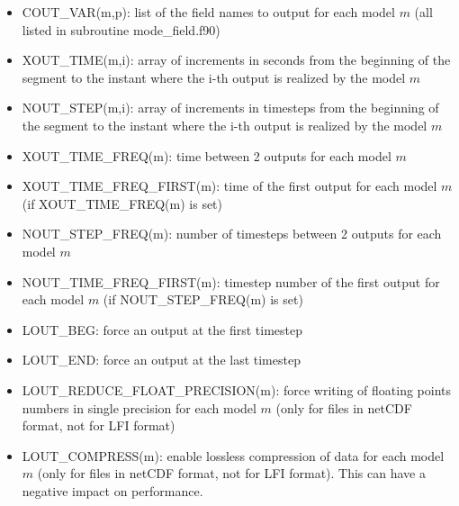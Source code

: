 \begin{itemize}

\item
COUT\_VAR(m,p): list of the field names to output for each model $m$ (all listed in subroutine mode\_field.f90)

\item
{} 
XOUT\_TIME(m,i): array of increments in seconds from the beginning of the segment to the instant where the i-th output is realized by the model $m$

\item
{} 
NOUT\_STEP(m,i): array of increments in timesteps from the beginning of the segment to the instant where the i-th output is realized by the model $m$

\item
{} 
XOUT\_TIME\_FREQ(m): time between 2 outputs for each model $m$

\item
{} 
XOUT\_TIME\_FREQ\_FIRST(m): time of the first output for each model $m$ (if XOUT\_TIME\_FREQ(m) is set)

\item
{} 
NOUT\_STEP\_FREQ(m): number of timesteps between 2 outputs for each model $m$

\item
{} 
NOUT\_TIME\_FREQ\_FIRST(m): timestep number of the first output for each model $m$ (if NOUT\_STEP\_FREQ(m) is set)

\item
{} 
LOUT\_BEG: force an output at the first timestep

\item
{} 
LOUT\_END: force an output at the last timestep

\item
{} 
LOUT\_REDUCE\_FLOAT\_PRECISION(m): force writing of floating points numbers in single precision for each model $m$ (only for files in netCDF format, not for LFI format)

\item
{} 
LOUT\_COMPRESS(m): enable lossless compression of data for each model $m$ (only for files in netCDF format, not for LFI format). This can have a negative impact on performance.


\end{itemize}
